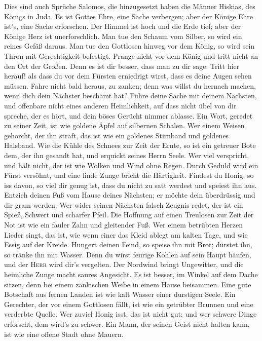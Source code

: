  Dies sind auch Sprüche Salomos, die hinzugesetzt haben
die Männer Hiskias, des Königs in Juda.  Es ist Gottes
Ehre, eine Sache verbergen; aber der Könige Ehre ist's, eine Sache
erforschen.  Der Himmel ist hoch und die Erde tief; aber
der Könige Herz ist unerforschlich.  Man tue den Schaum
vom Silber, so wird ein reines Gefäß daraus.  Man tue den
Gottlosen hinweg vor dem König, so wird sein Thron mit Gerechtigkeit
befestigt.  Prange nicht vor dem König und tritt nicht an
den Ort der Großen.  Denn es ist dir besser, dass man zu
dir sage: Tritt hier herauf! als dass du vor dem Fürsten erniedrigt
wirst, dass es deine Augen sehen müssen.  Fahre nicht bald
heraus, zu zanken; denn was willst du hernach machen, wenn dich dein
Nächster beschämt hat?  Führe deine Sache mit deinem
Nächsten, und offenbare nicht eines anderen Heimlichkeit,
 auf dass nicht übel von dir spreche, der es hört, und
dein böses Gerücht nimmer ablasse.  Ein Wort, geredet zu
seiner Zeit, ist wie goldene Äpfel auf silbernen Schalen.
 Wer einem Weisen gehorcht, der ihn straft, das ist wie
ein goldenes Stirnband und goldenes Halsband.  Wie die
Kühle des Schnees zur Zeit der Ernte, so ist ein getreuer Bote dem, der
ihn gesandt hat, und erquickt seines Herrn Seele.  Wer
viel verspricht, und hält nicht, der ist wie Wolken und Wind ohne Regen.
 Durch Geduld wird ein Fürst versöhnt, und eine linde
Zunge bricht die Härtigkeit.  Findest du Honig, so iss
davon, so viel dir genug ist, dass du nicht zu satt werdest und speiest
ihn aus.  Entzieh deinen Fuß vom Hause deines Nächsten;
er möchte dein überdrüssig und dir gram werden.  Wer
wider seinen Nächsten falsch Zeugnis redet, der ist ein Spieß, Schwert
und scharfer Pfeil.  Die Hoffnung auf einen Treulosen zur
Zeit der Not ist wie ein fauler Zahn und gleitender Fuß. 
Wer einem betrübten Herzen Lieder singt, das ist, wie wenn einer das
Kleid ablegt am kalten Tage, und wie Essig auf der Kreide.
 Hungert deinen Feind, so speise ihn mit Brot; dürstet
ihn, so tränke ihn mit Wasser.  Denn du wirst feurige
Kohlen auf sein Haupt häufen, und der \textsc{Herr} wird dir's
vergelten.  Der Nordwind bringt Ungewitter, und die
heimliche Zunge macht saures Angesicht.  Es ist besser,
im Winkel auf dem Dache sitzen, denn bei einem zänkischen Weibe in einem
Hause beisammen.  Eine gute Botschaft aus fernen Landen
ist wie kalt Wasser einer durstigen Seele.  Ein
Gerechter, der vor einem Gottlosen fällt, ist wie ein getrübter Brunnen
und eine verderbte Quelle.  Wer zuviel Honig isst, das
ist nicht gut; und wer schwere Dinge erforscht, dem wird's zu schwer.
 Ein Mann, der seinen Geist nicht halten kann, ist wie
eine offene Stadt ohne Mauern.

